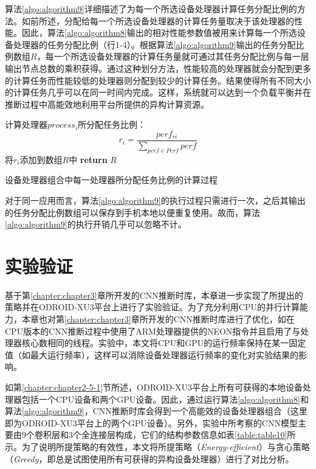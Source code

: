 算法\ref{algo:algorithm9}详细描述了为每一个所选设备处理器计算任务分配比例的方法。如前所述，分配给每一个所选设备处理器的计算任务量取决于该处理器的性能。因此，算法\ref{algo:algorithm8}输出的相对性能参数值被用来计算每一个所选设备处理器的任务分配比例（行1-4）。根据算法\ref{algo:algorithm9}输出的任务分配比例数组$R$，每一个所选设备处理器的计算任务量就可通过其任务分配比例与每一层输出节点总数的乘积获得。通过这种划分方法，性能较高的处理器就会分配到更多的计算任务而性能较低的处理器则分配到较少的计算任务。结果使得所有不同大小的计算任务几乎可以在同一时间内完成。这样，系统就可以达到一个负载平衡并在推断过程中高能效地利用平台所提供的异构计算资源。

\begin{algorithm}[htbp]
  \small
  \SetAlgoLined
    \begin{spacing}{0.85}
     {
        计算处理器$process_i$所分配任务比例：
        $$r_i=\frac{perf_{ri}}{\sum_{perf \in Perf}perf}$$
        将$r_i$添加到数组$R$中\;
    }
    \textbf{return} $R$\;
   \end{spacing}
  \caption{设备处理器组合中每一处理器所分配任务比例的计算过程}
  \label{algo:algorithm9}
\end{algorithm}

对于同一应用而言，算法\ref{algo:algorithm9}的执行过程只需进行一次，之后其输出的任务分配比例数组可以保存到手机本地以便重复使用。故而，算法\ref{algo:algorithm9}的执行开销几乎可以忽略不计。


\section{实验验证}
\label{chapter:chapter4-4}
基于第\ref{chapter:chapter3}章所开发的CNN推断时库，本章进一步实现了所提出的策略并在ODROID-XU3平台上进行了实验验证。为了充分利用CPU的并行计算能力，本章也对第\ref{chapter:chapter3}章所开发的CNN推断时库进行了优化，如在CPU版本的CNN推断过程中使用了ARM处理器提供的NEON指令并且启用了与处理器核心数相同的线程。实验中，本文将CPU和GPU的运行频率保持在某一固定值（如最大运行频率），这样可以消除设备处理器运行频率的变化对实验结果的影响。

如第\ref{chapter:chapter2-5-1}节所述，ODROID-XU3平台上所有可获得的本地设备处理器包括一个CPU设备和两个GPU设备。因此，通过运行算法\ref{algo:algorithm8}和算法\ref{algo:algorithm9}，CNN推断时库会得到一个高能效的设备处理器组合（这里即为ODROID-XU3平台上的两个GPU设备）。另外，实验中所考察的CNN模型主要由9个卷积层和3个全连接层构成，它们的结构参数信息如表\ref{table:table10}所示。为了说明所提策略的有效性，本文将所提策略（\emph{Energy-efficient}）与贪心策略（\emph{Greedy}，即总是试图使用所有可获得的异构设备处理器）进行了对比分析。

